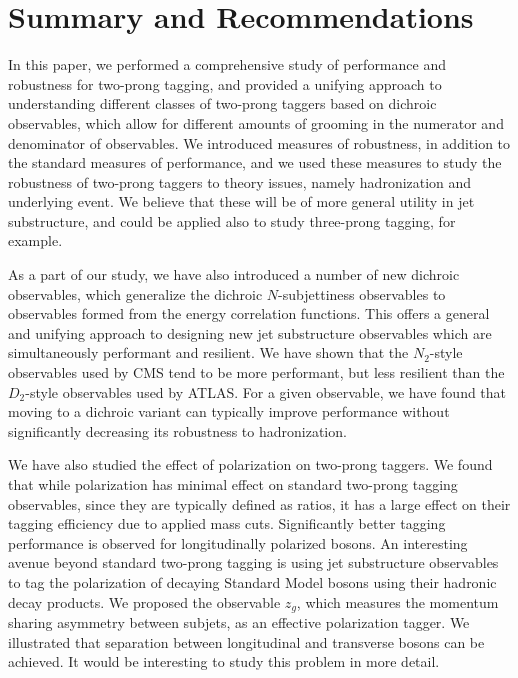 \documentclass[11pt]{cernrep}
\begin{document}
\section{Summary and Recommendations}\label{jetsub_2prong_sec:conc}

In this paper, we performed a comprehensive study of performance and robustness for two-prong tagging, and provided a unifying approach to understanding different classes of two-prong taggers based on dichroic observables, which allow for different amounts of grooming in the numerator and denominator of observables.
%
We introduced measures of robustness, in addition to the standard measures of performance, and we used these measures to study the robustness of two-prong taggers to theory issues, namely hadronization and underlying event.
%
We believe that these will be of more general utility in jet substructure, and could be applied also to study three-prong tagging, for example.

As a part of our study, we have also introduced a number of new dichroic observables, which generalize the dichroic $N$-subjettiness observables to observables formed from the energy correlation functions.
%
This offers a general and unifying approach to designing new jet substructure observables which are simultaneously performant and resilient.
%
We have shown that the $N_2$-style observables used by CMS tend to be more performant, but less resilient than the $D_2$-style observables used by ATLAS.
%
For a given observable, we have found that moving to a dichroic variant can typically improve performance without significantly decreasing its robustness to hadronization.

We have also studied the effect of polarization on two-prong taggers.
%
We found that while polarization has minimal effect on standard two-prong tagging observables, since they are typically defined as ratios, it has a large effect on their tagging efficiency due to applied mass cuts.
%
Significantly better tagging performance is observed for longitudinally polarized bosons.
%
An interesting avenue beyond standard two-prong tagging is using jet substructure observables to tag the polarization of decaying Standard Model bosons using their hadronic decay products.
%
We proposed the observable $z_g$, which measures the momentum sharing asymmetry between subjets, as an effective polarization tagger.
%
We illustrated that separation between longitudinal and transverse bosons can be achieved.
%
It would be interesting to study this problem in more detail.
\end{document}
